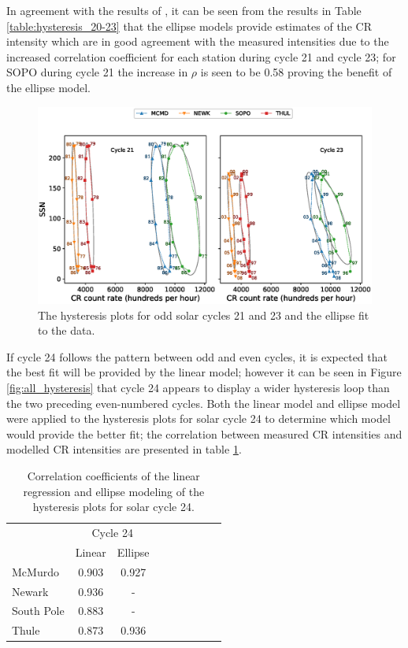 In agreement with the results of \cite{inceoglu_modeling_2014}, it can be seen from the results in Table \ref{table:hysteresis_20-23} that the ellipse models provide estimates of the CR intensity which are in good agreement with the measured intensities due to the increased correlation coefficient for each station during cycle 21 and cycle 23; for SOPO during cycle 21 the increase in $\rho$ is seen to be 0.58 proving the benefit of the ellipse model.

\begin{figure}
	\includegraphics[width=\columnwidth]{ellipse_odd.eps}
	\caption{The hysteresis plots for odd solar cycles 21 and 23 and the ellipse fit to the data.}
	\label{fig:ellipse_odd}
\end{figure}

If cycle 24 follows the pattern between odd and even cycles, it is expected that the best fit will be provided by the linear model; however it can be seen in Figure \ref{fig:all_hysteresis} that cycle 24 appears to display a wider hysteresis loop than the two preceding even-numbered cycles. Both the linear model and ellipse model were applied to the hysteresis plots for solar cycle 24 to determine which model would provide the better fit; the correlation between measured CR intensities and modelled CR intensities are presented in table \ref{table:hysteresis_24}.

\begin{table}[!ht]
	\begin{center}
	\caption{Correlation coefficients of the linear regression and ellipse modeling of the hysteresis plots for solar cycle 24.}
	\label{table:hysteresis_24}
	\begin{tabular}{l c c c c c c c c}
		\hline 
		{} & \multicolumn{2}{c}{Cycle 24} \\
		{} & {Linear} & {Ellipse} \\ \hline
		{McMurdo} & {0.903} & {0.927} \\
		{Newark} & {0.936} & {-} \\
		{South Pole} & {0.883} & {-} \\
		{Thule} & {0.873} & {0.936} \\ \hline
	\end{tabular}
	\end{center}
\end{table}

